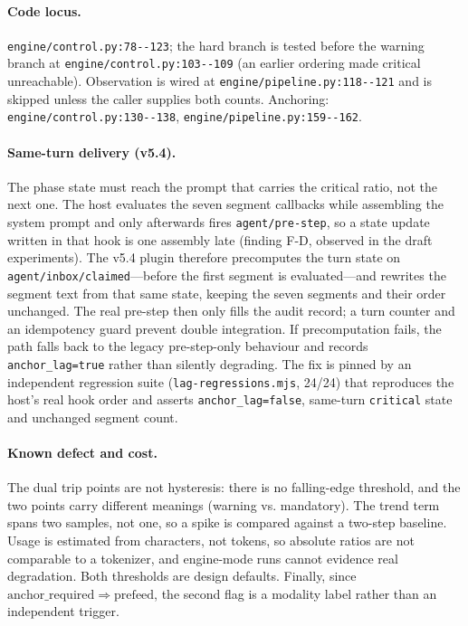 \paragraph{Code locus.} \texttt{engine/\allowbreak{}control.\allowbreak{}py:\allowbreak{}78-\allowbreak{}-\allowbreak{}123}; the hard branch is
tested before the warning branch at \texttt{engine/\allowbreak{}control.\allowbreak{}py:\allowbreak{}103-\allowbreak{}-\allowbreak{}109} (an
earlier ordering made critical unreachable). Observation is wired at
\texttt{engine/\allowbreak{}pipeline.\allowbreak{}py:\allowbreak{}118-\allowbreak{}-\allowbreak{}121} and is skipped unless the caller supplies
both counts. Anchoring: \texttt{engine/\allowbreak{}control.\allowbreak{}py:\allowbreak{}130-\allowbreak{}-\allowbreak{}138},
\texttt{engine/\allowbreak{}pipeline.\allowbreak{}py:\allowbreak{}159-\allowbreak{}-\allowbreak{}162}.

\paragraph{Same-turn delivery (v5.4).} The phase state must reach the prompt that
carries the critical ratio, not the next one. The host evaluates the seven
segment callbacks while assembling the system prompt and only afterwards fires
\texttt{agent/pre-step}, so a state update written in that hook is one assembly
late (finding F-D, observed in the draft experiments). The v5.4 plugin therefore
precomputes the turn state on \texttt{agent/inbox/claimed}---before the first
segment is evaluated---and rewrites the segment text from that same state, keeping
the seven segments and their order unchanged. The real pre-step then only fills
the audit record; a turn counter and an idempotency guard prevent double
integration. If precomputation fails, the path falls back to the legacy
pre-step-only behaviour and records \texttt{anchor\_lag=true} rather than
silently degrading. The fix is pinned by an independent regression suite
(\texttt{lag-regressions.mjs}, 24/24) that reproduces the host's real hook order
and asserts \texttt{anchor\_lag=false}, same-turn \texttt{critical} state and
\allowbreak{}unchanged segment count.

\paragraph{Known defect and cost.} The dual trip points are not hysteresis: there
is no falling-edge threshold, and the two points carry different meanings
(warning vs. mandatory). The trend term spans two samples, not one, so a spike
is compared against a two-step baseline. Usage is estimated from characters, not
tokens, so absolute ratios are not comparable to a tokenizer, and engine-mode
runs cannot evidence real degradation. Both thresholds are design defaults.
Finally, since $\mathrm{anchor\_required} \Rightarrow \mathrm{prefeed}$, the
second flag is a modality label rather than an independent trigger.

